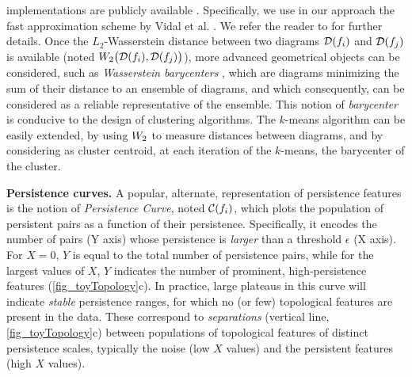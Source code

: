 implementations are publicly available \cite{ttk17, ttk19}.
Specifically, we use in our approach the fast approximation scheme by Vidal et al. \cite{vidal_vis19}.
We refer the reader to \cite{Kerber2016, vidal_vis19, ttk19} for further
details.
Once the $L_2$-Wasserstein distance between two diagrams $\mathcal{D}(f_i)$ and $\mathcal{D}(f_j)$ is available (noted $W_2\big(\mathcal{D}(f_i), \mathcal{D}(f_j)\big)$), more advanced geometrical objects can be considered, such as \emph{Wasserstein barycenters} \cite{Turner2014, vidal_vis19}, which are
diagrams minimizing the sum of their distance to an ensemble of diagrams, and which consequently, can be considered as a reliable representative of the ensemble.
This notion of \emph{barycenter}
is conducive to the design of clustering algorithms.
The $k$-means algorithm
can be easily extended,
by using $W_2$ to measure distances between diagrams, and by
considering as cluster centroid, at each iteration of the $k$-means, the
 barycenter of the cluster.


\noindent
\textbf{Persistence curves.}
A popular, alternate, representation of persistence features is the notion of
\emph{Persistence Curve}, noted $\mathcal{C}(f_i)$, which plots the
population of persistent pairs as a function of their persistence.
Specifically, it encodes the number of pairs (Y axis) whose persistence is
\emph{larger} than a threshold $\epsilon$ (X axis).
For $X=0$, $Y$ is equal to the total number of persistence pairs, while for the
largest values of $X$, $Y$ indicates the number of prominent, high-persistence
features (\autoref{fig_toyTopology}c).
In practice, large
plateaus in this curve will indicate \emph{stable} persistence ranges, for
which no (or few) topological features are present in the data. These 
correspond to \emph{separations} (vertical line, \autoref{fig_toyTopology}c) 
between populations of topological
features of distinct persistence scales, typically the noise (low $X$
values) and the persistent features (high $X$ values).

